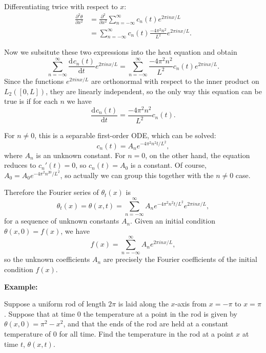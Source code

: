 \documentclass{article}
\newcommand{\deriv}[3][]{\frac{\mathrm{d}^{#1}#2}{\mathrm{d}#3^{#1}}}
\begin{document}
Differentiating twice with respect to $x$:
\begin{align*}
	\frac{\partial^2\theta}{\partial x^2}&=\frac{\partial^2}{\partial x^2}\sum_{n=-\infty}^\infty c_n(t)e^{2\pi i nx/L}\\
	&=\sum_{n=-\infty}^\infty c_n(t)\frac{-4\pi^2 n^2}{L^2} e^{2\pi i nx/L}.
\end{align*}

Now we subsitute these two expressions into the heat equation and obtain
\[\sum_{n=-\infty}^\infty \deriv{c_n(t)}{t}e^{2\pi inx/L}=\sum_{n=-\infty}^\infty \frac{-4\pi^2n^2}{L^2} c_n(t)e^{2\pi inx/L}.\]
Since the functions $e^{2\pi inx/L}$ are orthonormal with respect to the inner product on $L_2([0,L])$, they are linearly independent, so the only way this equation can be true is if for each $n$ we have
\[\deriv{c_n(t)}{t}=\frac{-4\pi^2 n^2}{L^2}c_n(t).\]

For $n\neq 0$, this is a separable first-order ODE, which can be solved:
\[c_n(t)=A_ne^{-4\pi^2n^2t/L^2},\]
where $A_n$ is an unknown constant. For $n=0$, on the other hand, the equation reduces to $c_n'(t)=0$, so $c_n(t)=A_0$ is a constant. Of course, $A_0=A_0e^{-4\pi^2n^20/L^2}$, so actually we can group this together with the $n\neq 0$ case.


Therefore the Fourier series of $\theta_t(x)$ is
\[\theta_t(x)=\theta(x,t)=\sum_{n=-\infty}^\infty A_n e^{-4\pi^2n^2t/L^2}e^{2\pi inx/L},\]
for a sequence of unknown constants $A_n$. Given an initial condition $\theta(x,0)=f(x)$, we have
\[f(x)=\sum_{n=-\infty}^\infty A_n e^{2\pi inx/L},\]
so the unknown coefficients $A_n$ are precisely the Fourier coefficients of the initial condition $f(x)$.



\clearpage



\textbf{Example:}\bigskip


Suppose a uniform rod of length $2\pi$ is laid along the $x$-axis from $x=-\pi$ to $x=\pi$. Suppose that at time 0 the temperature at a point in the rod is given by $\theta(x,0)=\pi^2-x^2$, and that the ends of the rod are held at a constant temperature of $0$ for all time. Find the temperature in the rod at a point $x$ at time $t$, $\theta(x,t)$.

\iffalse
\[c_n=\frac{-4\pi\cos(\pi n)}{n^2}=(-1)^{n+1}\frac{\pi}{n^2}\]
\[\theta(x,t) = \sum_{n=-\infty}^\infty \frac{(-1)^n\pi}{n^2}e^{n^2t+inx}\]
\fi
\end{document}
